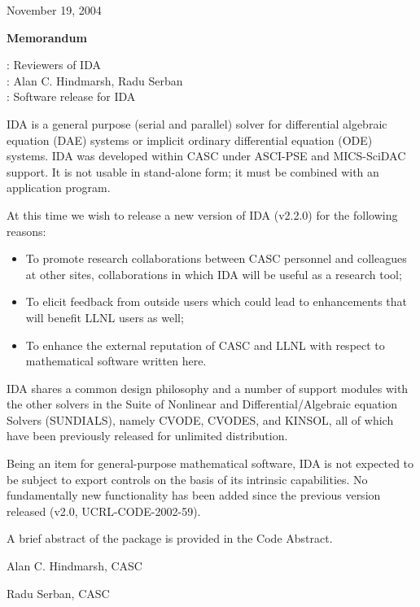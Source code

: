 \documentclass[12pt]{letter}
\begin{document}
\pagestyle{empty}

\begin{letter}

\hfill November 19, 2004

\vspace{0.2in}
\centerline{\bf Memorandum}

: Reviewers of IDA \\
: Alan C. Hindmarsh, Radu Serban \\
: Software release for IDA

IDA is a general purpose (serial and parallel) solver for differential algebraic
equation (DAE) systems or implicit ordinary differential equation (ODE) systems.
IDA was developed within CASC under ASCI-PSE and MICS-SciDAC support. 
It is not usable in stand-alone form; it must be combined with an application program.

At this time we wish to release a new version of IDA (v2.2.0) for the 
following reasons:
\begin{itemize}
\item To promote research collaborations between CASC personnel and colleagues at 
      other sites, collaborations in which IDA will be useful as a research tool;
\item To elicit feedback from outside users which could lead to enhancements that will 
      benefit LLNL users as well;
\item To enhance the external reputation of CASC and LLNL with respect to 
      mathematical software written here.
\end{itemize}

IDA shares a common design philosophy and a number of support modules with the 
other solvers in the Suite of Nonlinear and Differential/Algebraic equation Solvers (SUNDIALS), 
namely CVODE, CVODES, and KINSOL, all of which have been previously released for unlimited 
distribution.

Being an item for general-purpose mathematical software, IDA is not expected to be 
subject to export controls on the basis of its intrinsic capabilities. 
No fundamentally new functionality has been added since the previous version released
(v2.0, UCRL-CODE-2002-59).

A brief abstract of the package is provided in the Code Abstract. 


\vspace{0.5in}                 
\hfill Alan C. Hindmarsh, CASC

\vspace{0.5in}                 
\hfill Radu Serban, CASC


\end{letter}
\end{document}
